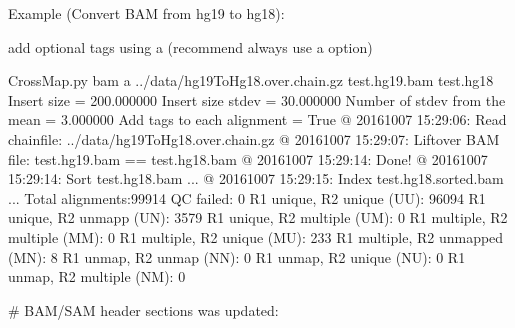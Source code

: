 \documentclass[letterpaper,10pt,english]{sphinxmanual}
\begin{document}
Example (Convert BAM from hg19 to hg18):

\begin{sphinxVerbatim}[commandchars=\\\{\}]
\PYGZsh{} add optional tags using \PYGZsq{}\PYGZhy{}a\PYGZsq{} (recommend always use \PYGZsq{}\PYGZhy{}a\PYGZsq{} option)

\PYGZdl{} CrossMap.py bam \PYGZhy{}a ../data/hg19ToHg18.over.chain.gz test.hg19.bam test.hg18
Insert size = 200.000000
Insert size stdev = 30.000000
Number of stdev from the mean = 3.000000
Add tags to each alignment = True
@ 2016\PYGZhy{}10\PYGZhy{}07 15:29:06: Read chain\PYGZus{}file:  ../data/hg19ToHg18.over.chain.gz
@ 2016\PYGZhy{}10\PYGZhy{}07 15:29:07: Liftover BAM file: test.hg19.bam ==\PYGZgt{} test.hg18.bam
@ 2016\PYGZhy{}10\PYGZhy{}07 15:29:14: Done!
@ 2016\PYGZhy{}10\PYGZhy{}07 15:29:14: Sort \PYGZdq{}test.hg18.bam\PYGZdq{} ...
@ 2016\PYGZhy{}10\PYGZhy{}07 15:29:15: Index \PYGZdq{}test.hg18.sorted.bam\PYGZdq{} ...
Total alignments:99914
       QC failed: 0
       R1 unique, R2 unique (UU): 96094
       R1 unique, R2 unmapp (UN): 3579
       R1 unique, R2 multiple (UM): 0
       R1 multiple, R2 multiple (MM): 0
       R1 multiple, R2 unique (MU): 233
       R1 multiple, R2 unmapped (MN): 8
       R1 unmap, R2 unmap (NN): 0
       R1 unmap, R2 unique (NU): 0
       R1 unmap, R2 multiple (NM): 0
\end{sphinxVerbatim}

\# BAM/SAM header sections was updated:
\end{document}
